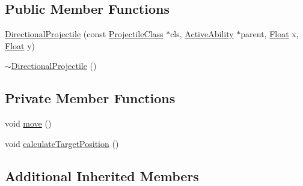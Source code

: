 \subsection*{Public Member Functions}
\begin{DoxyCompactItemize}
\item 
\hyperlink{classZeta_1_1DirectionalProjectile_ad411d16f495f9712188441535ae8b436}{Directional\+Projectile} (const \hyperlink{classZeta_1_1ProjectileClass}{Projectile\+Class} $\ast$cls, \hyperlink{classZeta_1_1ActiveAbility}{Active\+Ability} $\ast$parent, \hyperlink{namespaceZeta_a1e0a1265f9b3bd3075fb0fabd39088ba}{Float} x, \hyperlink{namespaceZeta_a1e0a1265f9b3bd3075fb0fabd39088ba}{Float} y)
\item 
\hyperlink{classZeta_1_1DirectionalProjectile_a6758be2164bd96353878e380e1ddaa16}{$\sim$\+Directional\+Projectile} ()
\end{DoxyCompactItemize}
\subsection*{Private Member Functions}
\begin{DoxyCompactItemize}
\item 
void \hyperlink{classZeta_1_1DirectionalProjectile_a90615ae6809e060094a7136db9460d2d}{move} ()
\item 
void \hyperlink{classZeta_1_1DirectionalProjectile_aafcfc8cb12d63fb4979f861924c8a4f6}{calculate\+Target\+Position} ()
\end{DoxyCompactItemize}
\subsection*{Additional Inherited Members}



